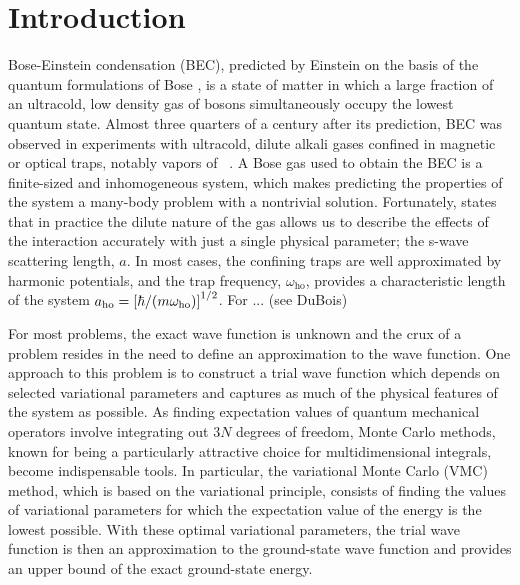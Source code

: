 \section{Introduction}\label{sec:Introduction}

Bose-Einstein condensation (BEC), predicted by Einstein \citeyearpar{BEC1924, BEC1925} on the basis of the quantum formulations of Bose \citeyearpar{Bose1924}, is a state of matter in which a large fraction of an ultracold, low density gas of bosons simultaneously occupy the lowest quantum state. Almost three quarters of a century after its prediction, BEC was observed in experiments with ultracold, dilute alkali gases confined in magnetic or optical traps, notably vapors of \rb \, \citep{BEC1995}. A Bose gas used to obtain the BEC is a finite-sized and inhomogeneous system, which makes predicting the properties of the system a many-body problem with a nontrivial solution. Fortunately, \citet{Dalfovo1999} states that in practice the dilute nature of the gas allows us to describe the effects of the interaction accurately with just a single physical parameter; the s-wave scattering length, $a$. In most cases, the confining traps are well approximated by harmonic potentials, and the trap frequency, $\omega_\mathrm{ho}$, provides a characteristic length of the system $a_\mathrm{ho} = \qty[\hbar / \qty(m \omega_\mathrm{ho})]^{1/2}$. For \rb... (see DuBois)

For most problems, the exact wave function is unknown and the crux of a problem resides in the need to define an approximation to the wave function. One approach to this problem is to construct a trial wave function which depends on selected variational parameters and captures as much of the physical features of the system as possible. As finding expectation values of quantum mechanical operators involve integrating out $3N$ degrees of freedom, Monte Carlo methods, known for being a particularly attractive choice for multidimensional integrals, become indispensable tools. In particular, the variational Monte Carlo (VMC) method, which is based on the variational principle, consists of finding the values of variational parameters for which the expectation value of the energy is the lowest possible. With these optimal variational parameters, the trial wave function is then an approximation to the ground-state wave function and provides an upper bound of the exact ground-state energy. 

